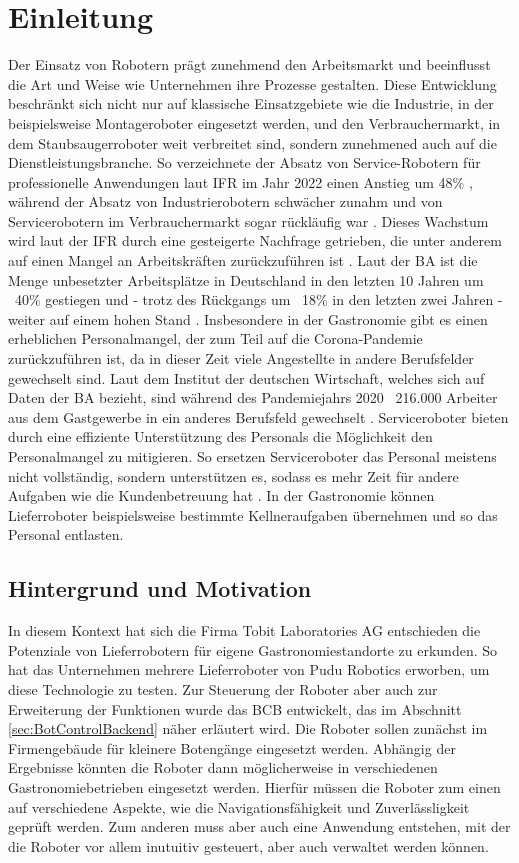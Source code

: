 \section{Einleitung}
Der Einsatz von Robotern prägt zunehmend den Arbeitsmarkt und beeinflusst die Art und Weise wie Unternehmen ihre Prozesse gestalten. Diese Entwicklung beschränkt sich nicht nur auf klassische Einsatzgebiete wie die Industrie, in der beispielsweise Montageroboter eingesetzt werden, und den Verbrauchermarkt, in dem Staubsaugerroboter weit verbreitet sind, sondern zunehmened auch auf die Dienstleistungsbranche. So verzeichnete der Absatz von Service-Robotern für professionelle Anwendungen laut \ac{IFR} im Jahr 2022 einen Anstieg um 48\% \cite{IFR2023}, während der Absatz von Industrierobotern schwächer zunahm \cite[S.~9]{WorldRobotics2023} und von Servicerobotern im Verbrauchermarkt sogar rückläufig war \cite[S.~37]{WorldRobotics2023}. Dieses Wachstum wird laut der \ac{IFR} durch eine gesteigerte Nachfrage getrieben, die unter anderem auf einen Mangel an Arbeitskräften zurückzuführen ist \cite[S.~33-34]{WorldRobotics2023}. Laut der \ac{BA} ist die Menge unbesetzter Arbeitsplätze in Deutschland in den letzten 10 Jahren um ~40\% gestiegen und - trotz des Rückgangs um ~18\% in den letzten zwei Jahren - weiter auf einem hohen Stand \cite{BA2024}. Insbesondere in der Gastronomie gibt es einen erheblichen Personalmangel, der zum Teil auf die Corona-Pandemie zurückzuführen ist, da in dieser Zeit viele Angestellte in andere Berufsfelder gewechselt sind. Laut dem Institut der deutschen Wirtschaft, welches sich auf Daten der \ac{BA} bezieht, sind während des Pandemiejahrs 2020 ~216.000 Arbeiter aus dem Gastgewerbe in ein anderes Berufsfeld gewechselt \cite[S.~1]{Jansen2022}. Serviceroboter bieten durch eine effiziente Unterstützung des Personals die Möglichkeit den Personalmangel zu mitigieren. So ersetzen Serviceroboter das Personal meistens nicht vollständig, sondern unterstützen es, sodass es mehr Zeit für andere Aufgaben wie die Kundenbetreuung hat \cite[S.~271-272]{Sprenger2015}. In der Gastronomie können Lieferroboter beispielsweise bestimmte Kellneraufgaben übernehmen und so das Personal entlasten.

\subsection{Hintergrund und Motivation}
In diesem Kontext hat sich die Firma Tobit Laboratories AG entschieden die Potenziale von Lieferrobotern für eigene Gastronomiestandorte zu erkunden. So hat das Unternehmen mehrere Lieferroboter von Pudu Robotics erworben, um diese Technologie zu testen. Zur Steuerung der Roboter aber auch zur Erweiterung der Funktionen wurde das \ac{BCB} entwickelt, das im Abschnitt \ref{sec:BotControlBackend} näher erläutert wird. Die Roboter sollen zunächst im Firmengebäude für kleinere Botengänge eingesetzt werden. Abhängig der Ergebnisse könnten die Roboter dann möglicherweise in verschiedenen Gastronomiebetrieben eingesetzt werden. Hierfür müssen die Roboter zum einen auf verschiedene Aspekte, wie die Navigationsfähigkeit und Zuverlässligkeit geprüft werden. Zum anderen muss aber auch eine Anwendung entstehen, mit der die Roboter vor allem inutuitiv gesteuert, aber auch verwaltet werden können.

